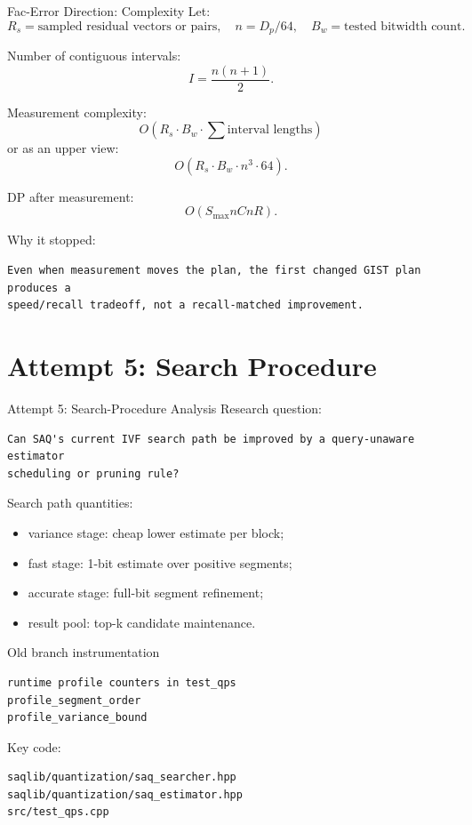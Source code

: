 \documentclass[aspectratio=169,10pt]{beamer}
\begin{document}
\begin{frame}[fragile]{Fac-Error Direction: Complexity}
\small
Let:
\[
R_s=\text{sampled residual vectors or pairs},\quad
n=D_p/64,\quad
B_w=\text{tested bitwidth count}.
\]

Number of contiguous intervals:
\[
I=\frac{n(n+1)}{2}.
\]

Measurement complexity:
\[
O(R_s\cdot B_w\cdot \sum\text{interval lengths})
\]
or as an upper view:
\[
O(R_s\cdot B_w\cdot n^3\cdot64).
\]

DP after measurement:
\[
O(S_{\max}nCnR).
\]

Why it stopped:
\begin{lstlisting}
Even when measurement moves the plan, the first changed GIST plan produces a
speed/recall tradeoff, not a recall-matched improvement.
\end{lstlisting}
\end{frame}

\section{Attempt 5: Search Procedure}

\begin{frame}[fragile]{Attempt 5: Search-Procedure Analysis}
\small
Research question:
\begin{lstlisting}
Can SAQ's current IVF search path be improved by a query-unaware estimator
scheduling or pruning rule?
\end{lstlisting}

Search path quantities:
\begin{itemize}
  \item variance stage: cheap lower estimate per block;
  \item fast stage: 1-bit estimate over positive segments;
  \item accurate stage: full-bit segment refinement;
  \item result pool: top-k candidate maintenance.
\end{itemize}

\begin{block}{Old branch instrumentation}
\begin{lstlisting}
runtime profile counters in test_qps
profile_segment_order
profile_variance_bound
\end{lstlisting}
\end{block}

Key code:
\begin{lstlisting}
saqlib/quantization/saq_searcher.hpp
saqlib/quantization/saq_estimator.hpp
src/test_qps.cpp
\end{lstlisting}
\end{frame}
\end{document}
